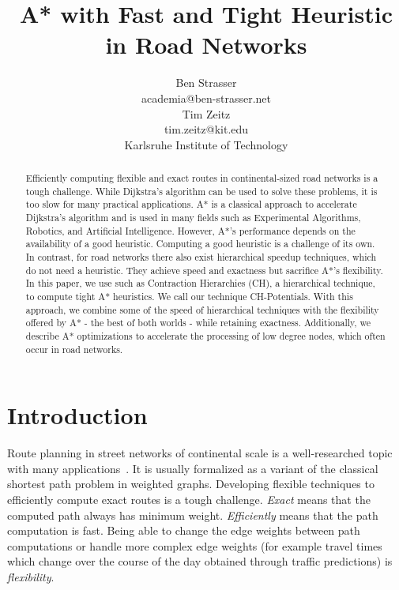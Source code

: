 \documentclass[letterpaper]{article} %
\title{A* with Fast and Tight Heuristic in Road Networks}
\author{Ben Strasser\\
academia@ben-strasser.net\\
\And
Tim Zeitz\\
tim.zeitz@kit.edu\\
Karlsruhe Institute of Technology
}
\begin{document}
\maketitle


\begin{abstract}
Efficiently computing flexible and exact routes in continental-sized road networks is a tough challenge.
While Dijkstra's algorithm can be used to solve these problems, it is too slow for many practical applications.
A* is a classical approach to accelerate Dijkstra's algorithm and is used in many fields such as Experimental Algorithms, Robotics, and Artificial Intelligence.
However, A*'s performance depends on the availability of a good heuristic.
Computing a good heuristic is a challenge of its own.
In contrast, for road networks there also exist hierarchical speedup techniques, which do not need a heuristic.
They achieve speed and exactness but sacrifice A*'s flexibility.
In this paper, we use such as Contraction Hierarchies (CH), a hierarchical technique, to compute tight A* heuristics.
We call our technique CH-Potentials.
With this approach, we combine some of the speed of hierarchical techniques with the flexibility offered by A* - the best of both worlds - while retaining exactness.
Additionally, we describe A* optimizations to accelerate the processing of low degree nodes, which often occur in road networks.
\end{abstract}

\section{Introduction}
\label{sec:intro}
Route planning in street networks of continental scale is a well-researched topic with many applications~\cite{bdgmpsww-rptn-16}.
It is usually formalized as a variant of the classical shortest path problem in weighted graphs.
Developing flexible techniques to efficiently compute exact routes is a tough challenge.
\emph{Exact} means that the computed path always has minimum weight.
\emph{Efficiently} means that the path computation is fast.
Being able to change the edge weights between path computations or handle more complex edge weights (for example travel times which change over the course of the day obtained through traffic predictions) is \emph{flexibility}.
\end{document}
